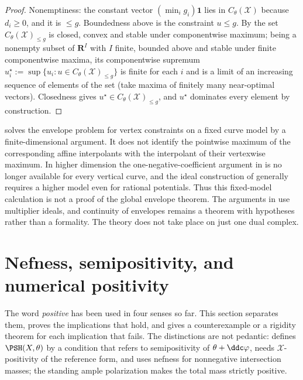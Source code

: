 \begin{proof}
Nonemptiness: the constant vector $(\min_ig_i)\mathbf 1$ lies in
$C_\theta(\mathcal X)$ because $d_i\geq0$, and it is $\leq g$.
Boundedness above is the constraint $u\leq g$.  By
 the set $C_\theta(\mathcal X)_{\le g}$ is
closed, convex and stable under componentwise maximum; being a nonempty
subset of $\mathbf R^I$ with $I$ finite, bounded above and stable under
finite componentwise maxima, its componentwise supremum
$u^\star_i:=\sup\{u_i:u\in C_\theta(\mathcal X)_{\le g}\}$ is finite for
each $i$ and is a limit of an increasing sequence of elements of the set
(take maxima of finitely many near-optimal vectors).  Closedness gives
$u^\star\in C_\theta(\mathcal X)_{\le g}$, and $u^\star$ dominates every
element by construction.
\end{proof}

\begin{remark}
\label{rem:ch20-fixed-model-envelope-scope}
 solves the envelope problem for vertex
constraints on a fixed curve model by a finite-dimensional argument.  It
does not identify the pointwise maximum of the corresponding affine
interpolants with the interpolant of their vertexwise maximum.  In higher
dimension the one-negative-coefficient argument in
 is no longer available for every vertical
curve, and the ideal construction of  generally
requires a higher model even for rational potentials.  Thus this fixed-model
calculation is not a proof of the global envelope theorem.  The arguments in
 use multiplier ideals, and continuity of envelopes
remains a theorem with hypotheses rather than a formality.  The theory does
not take place on just one dual complex.
\end{remark}

\section{Nefness, semipositivity, and numerical positivity}
\label{sec:ch20-positivity}

The word \emph{positive} has been used in four senses so far.  This section
separates them, proves the implications that hold, and gives a
counterexample or a rigidity theorem for each implication that fails.  The
distinctions are not pedantic:  defines
$\PSH(X,\theta)$ by a condition that refers to semipositivity of
$\theta+\ddc\varphi$,  needs
$\mathcal X$-positivity of the reference form, and
 uses nefness for nonnegative intersection masses;
the standing ample polarization makes the total mass strictly positive.

